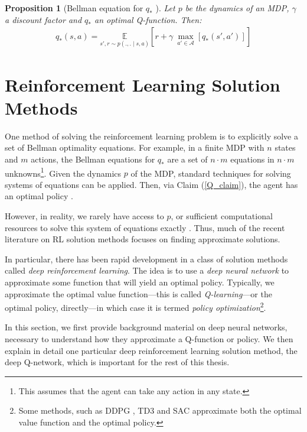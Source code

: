 \documentclass[11pt, a4paper, bibliography=totoc]{report}
\newtheorem{proposition}{Proposition}
\begin{document}
\begin{proposition}[Bellman equation for $ q_* $ {\cite[p.~63]{Sutton2018}}] \label{bellman_q*}
	Let $ p $ be the dynamics of an MDP, $ \gamma $ a discount factor and $ q_* $ an optimal Q-function. Then:
	\begin{align}
	q_*(s, a) = \underset{s', r \sim p(., . \mid s, a)}{\mathbb{E}} \left[ r + \gamma ~ \underset{a' \in \mathcal{A}}{\max}\left[q_*(s', a')\right] \right]
	\end{align}
\end{proposition}

\section{Reinforcement Learning Solution Methods} \label{RL_solution_methods}
One method of solving the reinforcement learning problem is to explicitly solve a set of Bellman optimality equations. For example, in a finite MDP with $ n $ states and $ m $ actions, the Bellman equations for $ q_* $ are a set of $ n\cdot m $ equations in $ n\cdot m $ unknowns\footnote{This assumes that the agent can take any action in any state.}. Given the dynamics $ p $ of the MDP, standard techniques for solving systems of equations can be applied. Then, via Claim (\ref{Q_claim}), the agent has an optimal policy \cite[p.~64]{Sutton2018}.

However, in reality, we rarely have access to $ p $, or sufficient computational resources to solve this system of equations exactly \cite[p.~66]{Sutton2018}. Thus, much of the recent literature on RL solution methods focuses on finding approximate solutions.

In particular, there has been rapid development in a class of solution methods called \textit{deep reinforcement learning}. The idea is to use a \textit{deep neural network} to approximate some function that will yield an optimal policy. Typically, we approximate the optimal value function---this is called \textit{Q-learning}---or the optimal policy, directly---in which case it is termed \textit{policy optimization}\footnote{Some methods, such as DDPG \cite{lillicrap2015continuous}, TD3 \cite{fujimoto2018addressing} and SAC \cite{haarnoja2018soft} approximate both the optimal value function and the optimal policy.}.

In this section, we first provide background material on deep neural networks, necessary to understand how they approximate a Q-function or policy. We then explain in detail one particular deep reinforcement learning solution method, the deep Q-network, which is important for the rest of this thesis.
\end{document}
